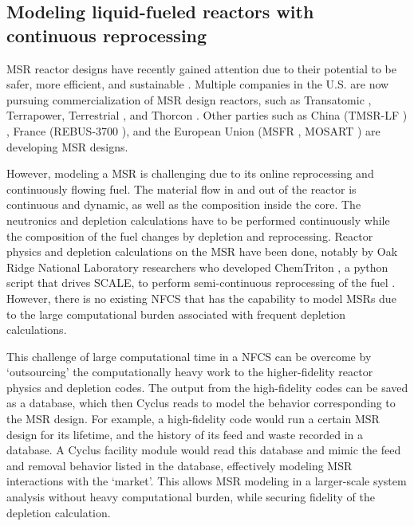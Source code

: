 \subsection{Modeling liquid-fueled reactors with continuous reprocessing}
\gls{MSR} reactor designs have recently gained attention due to 
their potential to be 
safer, more efficient, and sustainable \cite{serp_molten_2014}.
Multiple companies in the U.S. are now pursuing
commercialization of \gls{MSR} design reactors, such as Transatomic \cite{transatomic_power_corporation_technical_2016}
, Terrapower, Terrestrial \cite{leblanc_18_2017}, and
Thorcon \cite{jorgensen_19_2017}. Other parties such as China (TMSR-LF \cite{dai_17_2017}) ,
France (REBUS-3700 \cite{mourogov_potentialities_2006}),
and the European Union (MSFR \cite{heuer_towards_2014}, MOSART \cite{ignatiev_molten_2014})
are developing \gls{MSR} designs.

However, modeling a \gls{MSR} is challenging due to its online reprocessing
and continuously flowing fuel.
The material flow in and out of the reactor is continuous and dynamic, as well as the
composition inside the core.
The neutronics and depletion calculations have to be performed continuously while
the composition of the fuel changes by depletion and reprocessing.
Reactor physics and depletion calculations
on the \gls{MSR} have been done, notably by 
 Oak Ridge National Laboratory researchers who developed
ChemTriton \cite{powers_new_2013}, a python script that drives SCALE,
to perform semi-continuous reprocessing of the fuel \cite{powers_inventory_2014, betzler_fuel_2018}.
However, there is no existing \gls{NFCS} that has the capability to model \glspl{MSR}
due to the large computational burden associated with frequent depletion calculations.

This challenge of large computational time in a \gls{NFCS} can be overcome by `outsourcing' the computationally
heavy work to the higher-fidelity reactor physics and depletion codes. The output from the
high-fidelity codes can be saved as a database, which then Cyclus reads to model the behavior
corresponding to the \gls{MSR} design. For example, a high-fidelity code would run a certain
\gls{MSR} design for its lifetime, and the history of its feed and waste recorded in a
database. A Cyclus facility module would read this database and mimic the feed and removal
behavior listed in the database, effectively modeling \gls{MSR} interactions with the `market'.
This allows \gls{MSR} modeling in a larger-scale system analysis without heavy computational
burden, while securing fidelity of the depletion calculation.